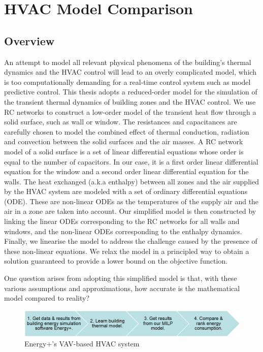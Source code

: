 \appendix
\chapter{HVAC Model Comparison}
\label{cha:ep}

\section{Overview}

An attempt to model all relevant physical phenomena of the building's thermal dynamics and the HVAC control will lead to an overly complicated model, which is too computationally demanding for a real-time control system such as model predictive control.
This thesis adopts a reduced-order model for the simulation of the transient thermal dynamics of building zones and the HVAC control. 
We use RC networks to construct a low-order model of the transient heat flow through a solid surface, such as wall or window. The resistances and capacitances are carefully chosen to model the combined effect of thermal conduction, radiation and convection between the solid surfaces and the air masses. A RC network model of a solid surface is a set of linear differential equations whose order is equal to the number of capacitors. In our case, it is a first order linear differential equation for the window and a second order linear differential equation for the walls. The heat exchanged (a.k.a enthalpy) between all zones and the air supplied by the HVAC system are modeled with a set of ordinary differential equations (ODE). These are non-linear ODEs as the temperatures of the supply air and the air in a zone are taken into account. Our simplified model is then constructed by linking the linear ODEs corresponding to the RC networks for all walls and windows, and the non-linear ODEs corresponding to the enthalpy dynamics. Finally, we linearise the model to address the challenge caused by the presence of these non-linear equations. We relax the model in a principled way to obtain a solution guaranteed to provide a lower bound on the objective function.

One question arises from adopting this simplified model is that, with these various assumptions and approximations, how accurate is the mathematical model compared to reality? 

\begin{figure}
	\centering
		\includegraphics[width=0.9\linewidth,keepaspectratio]{./figs/app_flow.png}		
	\caption{Energy+'s VAV-based HVAC system}
	\label{fig:epflow}
\end{figure}

